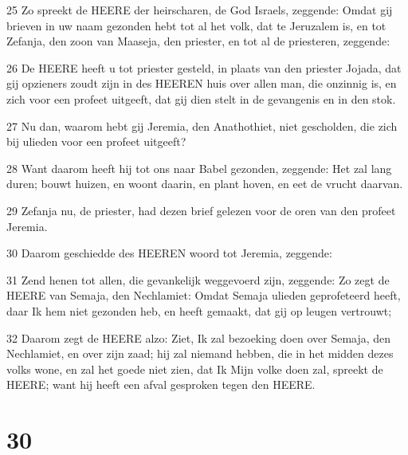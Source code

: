 \par 25 Zo spreekt de HEERE der heirscharen, de God Israels, zeggende: Omdat gij brieven in uw naam gezonden hebt tot al het volk, dat te Jeruzalem is, en tot Zefanja, den zoon van Maaseja, den priester, en tot al de priesteren, zeggende:
\par 26 De HEERE heeft u tot priester gesteld, in plaats van den priester Jojada, dat gij opzieners zoudt zijn in des HEEREN huis over allen man, die onzinnig is, en zich voor een profeet uitgeeft, dat gij dien stelt in de gevangenis en in den stok.
\par 27 Nu dan, waarom hebt gij Jeremia, den Anathothiet, niet gescholden, die zich bij ulieden voor een profeet uitgeeft?
\par 28 Want daarom heeft hij tot ons naar Babel gezonden, zeggende: Het zal lang duren; bouwt huizen, en woont daarin, en plant hoven, en eet de vrucht daarvan.
\par 29 Zefanja nu, de priester, had dezen brief gelezen voor de oren van den profeet Jeremia.
\par 30 Daarom geschiedde des HEEREN woord tot Jeremia, zeggende:
\par 31 Zend henen tot allen, die gevankelijk weggevoerd zijn, zeggende: Zo zegt de HEERE van Semaja, den Nechlamiet: Omdat Semaja ulieden geprofeteerd heeft, daar Ik hem niet gezonden heb, en heeft gemaakt, dat gij op leugen vertrouwt;
\par 32 Daarom zegt de HEERE alzo: Ziet, Ik zal bezoeking doen over Semaja, den Nechlamiet, en over zijn zaad; hij zal niemand hebben, die in het midden dezes volks wone, en zal het goede niet zien, dat Ik Mijn volke doen zal, spreekt de HEERE; want hij heeft een afval gesproken tegen den HEERE.

\chapter{30}

